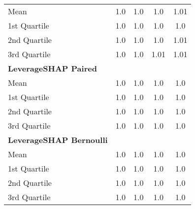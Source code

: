 {\begin{tabular} {lcccc}
\hspace{7pt}Mean & 1.0 & 1.0 & 1.0 & 1.01 \\ 
\hspace{7pt}1st Quartile & 1.0 & 1.0 & 1.0 & 1.0 \\ 
\hspace{7pt}2nd Quartile & 1.0 & 1.0 & 1.0 & 1.01 \\ 
\hspace{7pt}3rd Quartile & 1.0 & 1.0 & 1.01 & 1.01 \\ 
\addlinespace[1ex] 
\textbf{LeverageSHAP Paired} &  &  &  &  \\ 
\hspace{7pt}Mean & 1.0 & \cellcolor{bronze!60}1.0 & \cellcolor{bronze!60}1.0 & \cellcolor{bronze!60}1.0 \\ 
\hspace{7pt}1st Quartile & 1.0 & 1.0 & \cellcolor{bronze!60}1.0 & \cellcolor{bronze!60}1.0 \\ 
\hspace{7pt}2nd Quartile & \cellcolor{bronze!60}1.0 & 1.0 & \cellcolor{bronze!60}1.0 & \cellcolor{silver!60}1.0 \\ 
\hspace{7pt}3rd Quartile & 1.0 & \cellcolor{bronze!60}1.0 & \cellcolor{bronze!60}1.0 & \cellcolor{bronze!60}1.0 \\ 
\addlinespace[1ex] 
\textbf{LeverageSHAP Bernoulli} &  &  &  &  \\ 
\hspace{7pt}Mean & \cellcolor{gold!60}1.0 & \cellcolor{gold!60}1.0 & \cellcolor{gold!60}1.0 & \cellcolor{gold!60}1.0 \\ 
\hspace{7pt}1st Quartile & \cellcolor{silver!60}1.0 & \cellcolor{gold!60}1.0 & \cellcolor{gold!60}1.0 & \cellcolor{gold!60}1.0 \\ 
\hspace{7pt}2nd Quartile & \cellcolor{silver!60}1.0 & \cellcolor{silver!60}1.0 & \cellcolor{gold!60}1.0 & \cellcolor{gold!60}1.0 \\ 
\hspace{7pt}3rd Quartile & \cellcolor{gold!60}1.0 & \cellcolor{gold!60}1.0 & \cellcolor{gold!60}1.0 & \cellcolor{gold!60}1.0 \\ 
\bottomrule
\end{tabular}}